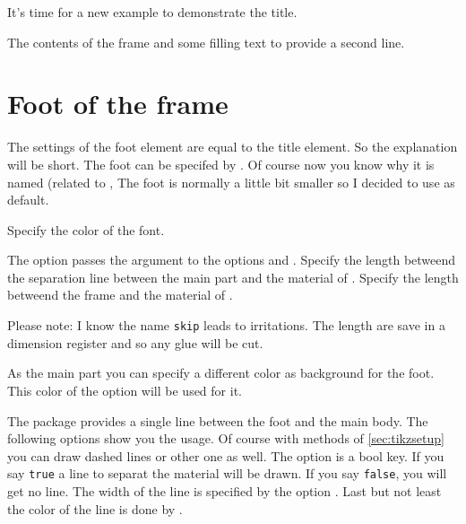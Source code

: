 \documentclass[openany,12pt,tocdepth=3]{ltx-md}
\begin{document}
It's time for a new example to demonstrate the title.

\begin{ltxexample}[caption={Example title part},label=title,result=true]
 \begin{xframed}[title-bg-color=brown!30,%
   line-width=2pt,line-color=brown!60,
  first-title={This is the title of the frame},
   margin=1.5cm,bg-color=yellow!20, ]
   The contents of the frame and some filling text to 
  provide a second line.
 \end{xframed}
\end{ltxexample}



\section{Foot of the frame}\label{sec:element-lastfoot}
The settings of the foot element are equal to the title element. So 
the explanation will be short. 
The foot can be specifed by . Of course now you
know why it is named  (related to ,
The foot is normally a little bit smaller so I decided to use  as
default.


Specify the color of the font.

The option  passes the argument to the options 
and .
Specify the length betweend the separation line between the main part and the material of .
Specify the length betweend the frame and the material of .

\faArrowRight Please note:  I know the name \texttt{skip} leads to irritations. The length are save in a
dimension register and so any glue will be cut.

As the main part you can specify a different color as background for
the foot. This color of the option  will be used for it.


The package  provides a single line between the foot and the main body.
The following options show you the usage. Of course with methods of
\autoref{sec:tikzsetup} you can draw dashed lines or other one as well.
The option  is a bool key. If you say \texttt{true} a line to separat
the material will be drawn. If you say \texttt{false}, you will get no line.
The width of the line is specified by the option .
Last but not least the color of the line is done by .
\end{document}
